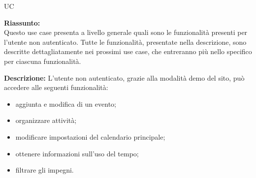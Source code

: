 \begin{listaPersonale}{UC}
    \newpage

    \begin{center}
        
    \end{center}
    \begin{listaPersonale2} [UC] {}
                \textbf{Riassunto:} \\
                Questo use case presenta a livello generale quali sono le funzionalità presenti per l'utente non autenticato. Tutte le funzionalità, presentate nella descrizione, sono descritte dettagliatamente nei prossimi use case, che entreranno più nello specifico per ciascuna funzionalità.

                \textbf{Descrizione:}
                L'utente non autenticato, grazie alla modalità demo del sito, può accedere alle seguenti funzionalità:
                \begin{itemize}
                    \item aggiunta e modifica di un evento;
                    \item organizzare attività;
                    \item modificare impostazioni del calendario principale;
                    \item ottenere informazioni sull'uso del tempo;
                    \item filtrare gli impegni.
                \end{itemize}


\end{listaPersonale2}
\end{listaPersonale}
